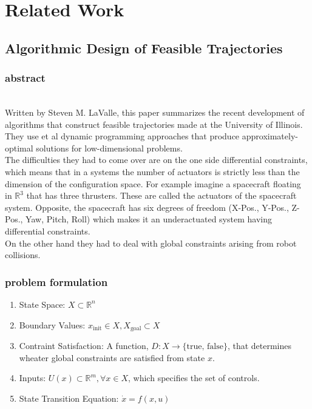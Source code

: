 \documentclass[conference]{IEEEtran}
\begin{document}
\section{Related Work}
\subsection{Algorithmic Design of Feasible Trajectories}
\subsubsection{abstract}
\quad \\
Written by Steven M. LaValle, this paper summarizes the recent development of algorithms that construct feasible trajectories made at the University of Illinois. They use et al dynamic programming approaches that produce approximately-optimal solutions for low-dimensional problems. \\
The difficulties they had to come over are on the one side differential constraints, which means that in a systems the number of actuators is strictly less than the dimension of the configuration space. For example imagine a spacecraft floating in $\mathbb{R}^3$ that has three thrusters. These are called the actuators of the spacecraft system. Opposite, the spacecraft has six degrees of freedom (X-Pos., Y-Pos., Z-Pos., Yaw, Pitch, Roll) which makes it an underactuated system having differential constraints.\\
On the other hand they had to deal with global constraints arising from robot collisions.\\
\subsubsection{problem formulation}
\begin{enumerate}
\item State Space: $X \subset \mathbb{R}^n$
\item Boundary Values: $x_\text{init} \in X, X_\text{goal} \subset X$
\item Contraint Satisfaction: A function, $D : X \rightarrow \{\text{true, false}\}$, that determines wheater global constraints are satisfied from state $x$.
\item Inputs: $U(x) \subset \mathbb{R}^m, \forall x \in X$, which specifies the set of controls.
\item State Transition Equation: $\dot{x} = f(x, u)$
\end{enumerate}
\end{document}
